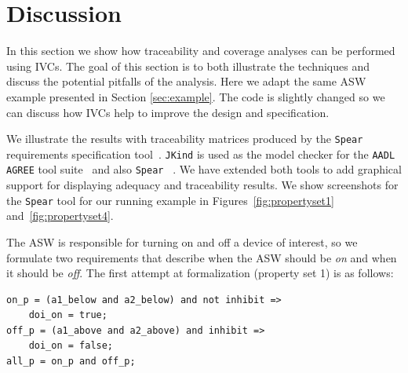 \section{Discussion}
\label{sec:disc}


\newcommand{\allp}{\texttt{all\_p}}
\newcommand{\onp}{\texttt{on\_p}}
\newcommand{\offp}{\texttt{off\_p}}
\newcommand{\hystp}{\texttt{hyst\_p}}
\newcommand{\aonebelow}{\texttt{a1\_below}}
\newcommand{\atwobelow}{\texttt{a2\_below}}
\newcommand{\aoneabove}{\texttt{a1\_above}}
\newcommand{\atwoabove}{\texttt{a2\_above}}
\newcommand{\doion}{\texttt{doi\_on}}
\newcommand{\done}{\texttt{d1}}
\newcommand{\dtwo}{\texttt{d2}}
\newcommand{\abovehyst}{\texttt{above\_hyst}}
\newcommand{\inhibit}{\texttt{inhibit}}

In this section we show how traceability and coverage analyses can be performed using IVCs.
The goal of this section is to both illustrate the techniques and discuss the potential pitfalls of the analysis. Here we adapt the same ASW example presented in Section \ref{sec:example}. The code is slightly changed so we can discuss how IVCs help to improve the design and specification.


 We illustrate the results with traceability matrices produced by the  \texttt{Spear} requirements specification tool~\cite{Spear}.  \texttt{JKind} is used as the model checker for the  \texttt{AADL AGREE} tool suite~\cite{NFM2012:CoGaMiWhLaLu} and also \texttt{Spear} ~\cite{Spear}.  We have extended both tools to add graphical support for displaying adequacy and traceability results.  We show screenshots for the  \texttt{Spear} tool for our running example in Figures~\ref{fig:propertyset1} and~\ref{fig:propertyset4}.

The ASW is responsible for turning on and off a device of interest, so we formulate two requirements that describe when the ASW should be {\em on} and when it should be {\em off}.  The first attempt at formalization (property set 1) is as follows:

{\smaller
\begin{verbatim}
on_p = (a1_below and a2_below) and not inhibit =>
    doi_on = true;
off_p = (a1_above and a2_above) and inhibit =>
    doi_on = false;
all_p = on_p and off_p;
\end{verbatim}
}

